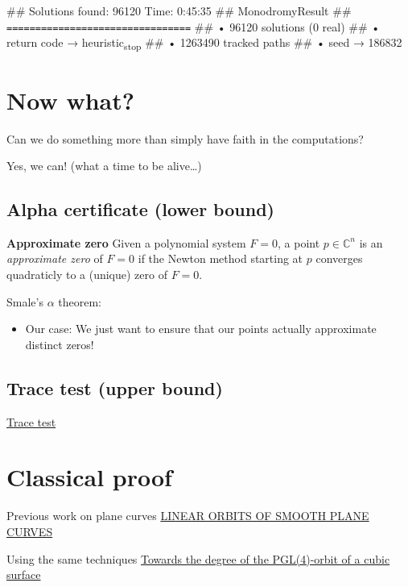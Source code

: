\documentclass[11pt]{article}
\begin{document}
\#\# Solutions found: 96120 	 Time: 0:45:35
\#\# MonodromyResult
\#\# \texttt{================================}
\#\# • 96120 solutions (0 real)
\#\# • return code → heuristic\textsubscript{stop}
\#\# • 1263490 tracked paths
\#\# • seed → 186832

\section{Now what?}
\label{sec:org51017ca}

Can we do something more than simply have faith in the computations?

Yes, we can! (what a time to be alive\ldots{})

\subsection{Alpha certificate (lower bound)}
\label{sec:org03a03a8}

\textbf{Approximate zero} Given a polynomial system \(F=0\),
a point \(p\in \mathbb{C}^n\) is an \emph{approximate zero} of \(F=0\)
if the Newton method starting at \(p\) converges quadraticly to a (unique) zero of \(F=0\).

Smale's \(\alpha\) theorem:

\begin{itemize}
\item Our case: We just want to ensure that our points actually approximate distinct zeros!
\end{itemize}


\subsection{Trace test (upper bound)}
\label{sec:org2769c00}

\href{trace-test.pdf}{Trace test}

\section{Classical proof}
\label{sec:org9c5aa7f}

Previous work on plane curves
\href{aluffi.pdf}{LINEAR ORBITS OF SMOOTH PLANE CURVES}

Using the same techniques
\href{2002-Article Text-6177-1-10-20200909.pdf}{Towards the degree of the PGL(4)-orbit of a cubic surface}
\end{document}
